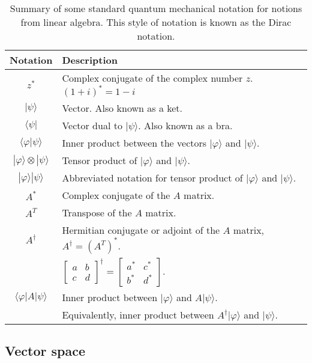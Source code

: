 \documentclass[
	11pt, %
	fleqn, %
	a4paper, %
]{LegrandOrangeBook}
\begin{document}
\begin{table}[]
    \centering
    \begin{tabular}{c|l}
        \hline\hline
        Notation & Description \\
        \hline
        $z^{*}$ & Complex conjugate of the complex number $z$. $(1+i)^{*}=1-i$\\
        $|\psi\rangle$& Vector. Also known as a ket. \\
        $\langle\psi|$& Vector dual to $|\psi\rangle$. Also known as a bra. \\
        $\langle\varphi | \psi\rangle$& Inner product between the vectors $|\varphi\rangle$ and $|\psi\rangle$. \\
        $|\varphi\rangle \otimes|\psi\rangle$& Tensor product of $|\varphi\rangle$ and $|\psi\rangle$. \\
        $|\varphi\rangle|\psi\rangle$& Abbreviated notation for tensor product of $|\varphi\rangle$ and $|\psi\rangle$. \\
        $A^{*}$& Complex conjugate of the $A$ matrix. \\
        $A^{T}$& Transpose of the $A$ matrix. \\
         $A^{\dagger}$& Hermitian conjugate or adjoint of the $A$ matrix, $A^{\dagger}=\left(A^{T}\right)^{*}$. \\
         & $\left[\begin{array}{cc}a & b \\ c & d\end{array}\right]^{\dagger}=\left[\begin{array}{cc}a^{*} & c^{*} \\ b^{*} & d^{*}\end{array}\right]$. \\
        $\langle\varphi|A| \psi\rangle$ & Inner product between $|\varphi\rangle$ and $A|\psi\rangle$. \\
         & Equivalently, inner product between $A^{\dagger}|\varphi\rangle$ and $|\psi\rangle$. \\
        \hline\hline
    \end{tabular}
\caption{Summary of some standard quantum mechanical notation for notions from linear algebra. This style of notation is known as the Dirac notation.}
\label{tab:summary_AL}
\end{table}

\subsection{Vector space} %
\end{document}
